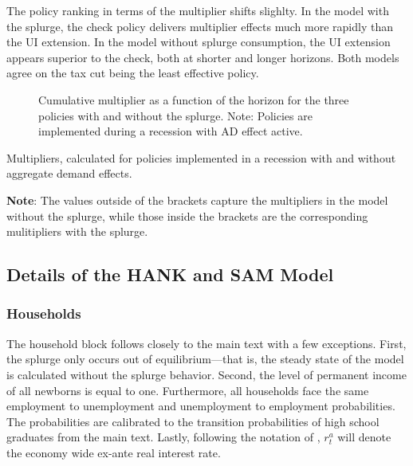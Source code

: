 The policy ranking in terms of the multiplier shifts slighlty.
In the model with the splurge, the check policy delivers multiplier effects much more rapidly than the UI extension.
In the model without splurge consumption, the UI extension appears superior to the check, both at shorter and longer horizons.
Both models agree on the tax cut being the least effective policy.


\begin{figure}[t]
	\centering
	\caption{Cumulative multiplier as a function of the horizon for the three policies with and without the splurge. Note: Policies are implemented during a recession with AD effect active.}
	\label{fig:cumulativemultipliers_SplurgeComp}
\end{figure}


\begin{table}[t]
	\center
	
	\caption{Multipliers, calculated for policies implemented in a recession with and without aggregate demand effects. }
	\parbox{16cm}{\small \vspace{.15cm} \textbf{Note}: The values outside of the brackets capture the multipliers in the model without the splurge, while those inside the brackets are the corresponding mulitipliers with the splurge. \normalsize}
	\label{tab:Multiplier_SplurgeComp}
\end{table}




\hypertarget{hank_appendix}{}\par\subsection{Details of the HANK and SAM Model}
\label{sec:hank_appendix}


\subsubsection{Households}

The household block follows closely to the main text with a few exceptions. First, the splurge only occurs out of equilibrium---that is, the steady state of the model is calculated without the splurge behavior. Second, the level of permanent income of all newborns is equal to one. Furthermore, all households face the same employment to unemployment and unemployment to employment probabilities. The probabilities are calibrated to the transition probabilities of high school graduates from the main text. Lastly, following the notation of \cite{Auclert2020}, $r^{a}_{t}$ will denote the economy wide ex-ante real interest rate.


